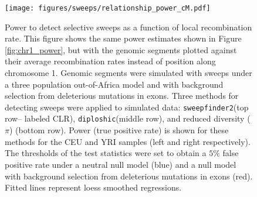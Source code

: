 \documentclass[hidelinks]{article}
\newcommand{\sweepfinder}{\texttt{sweepfinder2}\xspace}
\newcommand{\diploshic}{\texttt{diploshic}\xspace}
\begin{document}
    \begin{figure}[b!]
        \centering
        \texttt{[image: figures/sweeps/relationship\_power\_cM.pdf]}
        \caption{
        Power to detect selective sweeps
        as a function of local recombination rate.
        This figure shows the same power estimates shown in Figure \ref{fig:chr1_power},
        but with the genomic segments plotted against their
        average recombination rates instead of position along chromosome 1.
    	Genomic segments were simulated with sweeps under a three population out-of-Africa model
        and with background selection from deleterious mutations in exons.
        Three methods for detecting sweeps were applied to simulated data:
        \sweepfinder (top row-- labeled CLR),
        \diploshic (middle row),
        and reduced diversity ($\pi$) (bottom row).
        Power (true positive rate) is shown for these methods for the CEU and YRI
        samples (left and right respectively).
        The thresholds of the test statistics were set to obtain a
        $5\%$ false positive rate under a neutral null model (blue)
        and a null model with background selection from deleterious mutations in exons (red).
        Fitted lines represent loess smoothed regressions.
        }
        \label{fig:power-recomb}
    \end{figure}
\end{document}
